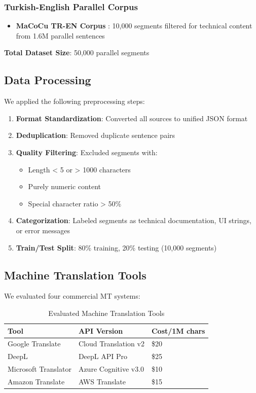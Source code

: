 \subsubsection{Turkish-English Parallel Corpus}

\begin{itemize}
    \item \textbf{MaCoCu TR-EN Corpus} \cite{macocu2021}: 10,000 segments filtered for technical content from 1.6M parallel sentences
\end{itemize}

\textbf{Total Dataset Size}: 50,000 parallel segments

\subsection{Data Processing}

We applied the following preprocessing steps:

\begin{enumerate}
    \item \textbf{Format Standardization}: Converted all sources to unified JSON format
    \item \textbf{Deduplication}: Removed duplicate sentence pairs
    \item \textbf{Quality Filtering}: Excluded segments with:
    \begin{itemize}
        \item Length < 5 or > 1000 characters
        \item Purely numeric content
        \item Special character ratio > 50\%
    \end{itemize}
    \item \textbf{Categorization}: Labeled segments as technical documentation, UI strings, or error messages
    \item \textbf{Train/Test Split}: 80\% training, 20\% testing (10,000 segments)
\end{enumerate}

\subsection{Machine Translation Tools}

We evaluated four commercial MT systems:

\begin{table}[h]
\centering
\caption{Evaluated Machine Translation Tools}
\begin{tabular}{@{}lll@{}}
\toprule
\textbf{Tool} & \textbf{API Version} & \textbf{Cost/1M chars} \\ \midrule
Google Translate & Cloud Translation v2 & \$20 \\
DeepL & DeepL API Pro & \$25 \\
Microsoft Translator & Azure Cognitive v3.0 & \$10 \\
Amazon Translate & AWS Translate & \$15 \\ \bottomrule
\end{tabular}
\label{tab:mt_tools}
\end{table}

